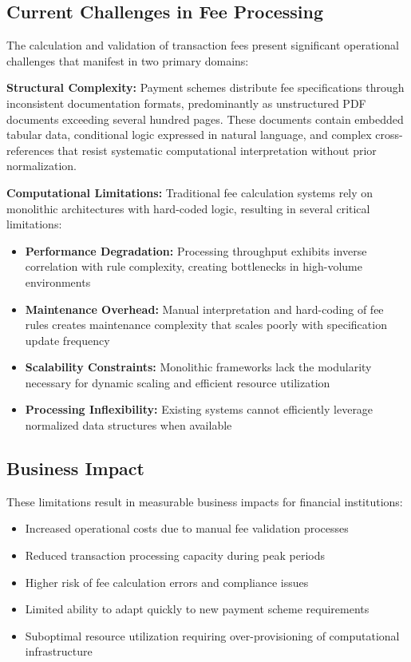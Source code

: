 \subsection{Current Challenges in Fee Processing}

The calculation and validation of transaction fees present significant operational challenges that manifest in two primary domains:

\textbf{Structural Complexity:} Payment schemes distribute fee specifications through inconsistent documentation formats, predominantly as unstructured PDF documents exceeding several hundred pages. These documents contain embedded tabular data, conditional logic expressed in natural language, and complex cross-references that resist systematic computational interpretation without prior normalization.

\textbf{Computational Limitations:} Traditional fee calculation systems rely on monolithic architectures with hard-coded logic, resulting in several critical limitations:

\begin{itemize}
   \item \textbf{Performance Degradation:} Processing throughput exhibits inverse correlation with rule complexity, creating bottlenecks in high-volume environments
   \item \textbf{Maintenance Overhead:} Manual interpretation and hard-coding of fee rules creates maintenance complexity that scales poorly with specification update frequency
   \item \textbf{Scalability Constraints:} Monolithic frameworks lack the modularity necessary for dynamic scaling and efficient resource utilization
   \item \textbf{Processing Inflexibility:} Existing systems cannot efficiently leverage normalized data structures when available
\end{itemize}

\subsection{Business Impact}

These limitations result in measurable business impacts for financial institutions:

\begin{itemize}
   \item Increased operational costs due to manual fee validation processes
   \item Reduced transaction processing capacity during peak periods
   \item Higher risk of fee calculation errors and compliance issues
   \item Limited ability to adapt quickly to new payment scheme requirements
   \item Suboptimal resource utilization requiring over-provisioning of computational infrastructure
\end{itemize}

